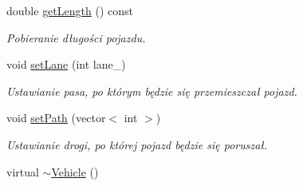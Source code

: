 \begin{DoxyCompactItemize}
double \hyperlink{class_vehicle_adf0dea6131864a4c28bb6bc79f78e44b}{get\-Length} () const 
\begin{DoxyCompactList}\small\item\em Pobieranie długości pojazdu. \end{DoxyCompactList}\item 
void \hyperlink{class_vehicle_ac880cb0a7eb1dac30267341e8034a86a}{set\-Lane} (int lane\-\_\-)
\begin{DoxyCompactList}\small\item\em Ustawianie pasa, po którym będzie się przemieszczał pojazd. \end{DoxyCompactList}\item 
void \hyperlink{class_vehicle_a90d48dc21a8c5d82149b35bed4caf84d}{set\-Path} (vector$<$ int $>$)
\begin{DoxyCompactList}\small\item\em Ustawianie drogi, po której pojazd będzie się poruszał. \end{DoxyCompactList}\item 
virtual \hyperlink{class_vehicle_a61ab140c755b8e0e824d54117cf4546f}{$\sim$\-Vehicle} ()
\end{DoxyCompactItemize}
